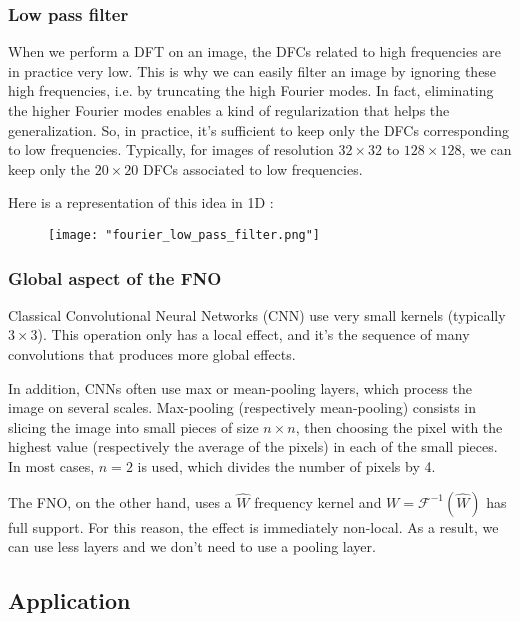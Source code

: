 \subsubsection{Low pass filter}

When we perform a DFT on an image, the DFCs related to high frequencies are in practice very low. This is why we can easily filter an image by ignoring these high frequencies, i.e. by truncating the high Fourier modes. In fact, eliminating the higher Fourier modes enables a kind of regularization that helps the generalization. So, in practice, it's sufficient to keep only the DFCs corresponding to low frequencies. Typically, for images of resolution $32\times 32$ to $128\times 128$, we can keep only the $20\times 20$ DFCs associated to low frequencies.

Here is a representation of this idea in 1D :

\begin{figure}[H]
	\centering
	\texttt{[image: "fourier\_low\_pass\_filter.png"]}
\end{figure}

\subsubsection{Global aspect of the FNO}

Classical Convolutional Neural Networks (CNN) use very small kernels (typically $3\times 3$). This operation only has a local effect, and it's the sequence of many convolutions that produces more global effects. 

In addition, CNNs often use max or mean-pooling layers, which process the image on several scales. Max-pooling (respectively mean-pooling) consists in slicing the image into small pieces of size $n\times n$, then choosing the pixel with the highest value (respectively the average of the pixels) in each of the small pieces. In most cases, $n=2$ is used, which divides the number of pixels by 4.

The FNO, on the other hand, uses a $\hat{W}$ frequency kernel and $W=\mathcal{F}^{-1}(\hat{W})$ has full support. For this reason, the effect is immediately non-local. As a result, we can use less layers and we don't need to use a pooling layer.

\subsection{Application} \label{FNO.application}

